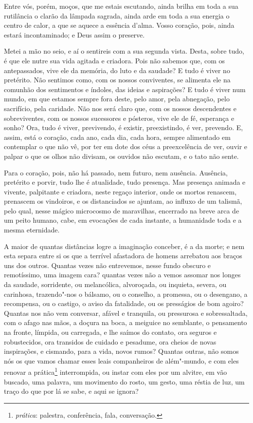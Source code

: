 Entre vós, porém, moços, que me estais escutando, ainda brilha em
toda a sua rutilância o clarão da lâmpada sagrada, ainda arde em toda a
sua energia o centro de calor, a que se aquece a essência
d'alma. Vosso coração, pois, ainda estará
incontaminado; e Deus assim o preserve.

Metei a mão no seio, e aí o sentireis com a sua segunda vista.
Desta, sobre tudo, é que ele nutre sua vida agitada e criadora. Pois
não sabemos que, com os antepassados, vive ele da memória, do luto e da
saudade? E tudo é viver no pretérito. Não sentimos como, com os nossos
conviventes, se alimenta ele na comunhão dos sentimentos e índoles, das
ideias e aspirações? E tudo é viver num mundo, em que estamos sempre
fora deste, pelo amor, pela abnegação, pelo sacrifício, pela caridade.
Não nos será claro que, com os nossos descendentes e sobreviventes, com
os nossos sucessores e pósteros, vive ele de fé, esperança e sonho?
Ora, tudo é viver, previvendo, é existir, preexistindo, é ver,
prevendo. E, assim, está o coração, cada ano, cada dia, cada hora,
sempre alimentado em contemplar o que não vê, por ter em dote dos céus
a preexcelência de ver, ouvir e palpar o que os olhos não divisam, os
ouvidos não escutam, e o tato não sente.

Para o coração, pois, não há passado, nem futuro, nem ausência.
Ausência, pretérito e porvir, tudo lhe é atualidade, tudo presença. Mas
presença animada e vivente, palpitante e criadora, neste regaço
interior, onde os mortos renascem, prenascem os vindoiros, e os
distanciados se ajuntam, ao influxo de um talismã, pelo qual, nesse
mágico microcosmo de maravilhas, encerrado na breve arca de um peito
humano, cabe, em evocações de cada instante, a humanidade toda e a
mesma eternidade.

A maior de quantas distâncias logre a imaginação conceber, é a da
morte; e nem esta separa entre si os que a terrível afastadora de
homens arrebatou aos braços uns dos outros. Quantas vezes não
entrevemos, nesse fundo obscuro e remotíssimo, uma imagem cara? quantas
vezes não a vemos assomar nos longes da saudade, sorridente, ou
melancólica, alvoroçada, ou inquieta, severa, ou carinhosa,
trazendo"-nos o bálsamo, ou o conselho, a promessa, ou o desengano, a
recompensa, ou o castigo, o aviso da fatalidade, ou os presságios de
bom agoiro? Quantas nos não vem conversar, afável e tranquila, ou
pressurosa e sobressaltada, com o afago nas mãos, a doçura na boca, a
meiguice no semblante, o pensamento na fronte, límpida, ou carregada, e
lhe saímos do contato, ora seguros e robustecidos, ora
transidos de cuidado e
pesadume, ora cheios de novas inspirações, e cismando, para a vida,
novos rumos? Quantas outras, não somos nós os que vamos chamar esses
leais companheiros de além"-mundo, e com eles renovar a
prática\footnote{ \textit{prática}: palestra, conferência, fala,
conversação.} interrompida, ou instar com eles por um alvitre, em
vão buscado, uma palavra, um movimento do rosto, um gesto, uma réstia
de luz, um traço do que por lá se sabe, e aqui se ignora?


